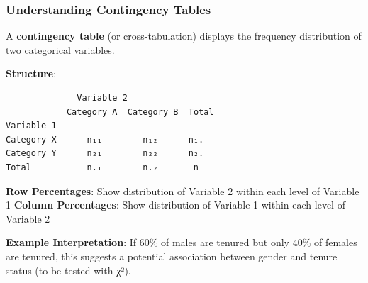 \documentclass[11pt]{article}
\begin{document}
    \subsubsection{Understanding Contingency
Tables}\label{understanding-contingency-tables}

A \textbf{contingency table} (or cross-tabulation) displays the
frequency distribution of two categorical variables.

\textbf{Structure}:

\begin{verbatim}
              Variable 2
            Category A  Category B  Total
Variable 1  
Category X      n₁₁        n₁₂      n₁.
Category Y      n₂₁        n₂₂      n₂.
Total           n.₁        n.₂       n
\end{verbatim}

\textbf{Row Percentages}: Show distribution of Variable 2 within each
level of Variable 1 \textbf{Column Percentages}: Show distribution of
Variable 1 within each level of Variable 2

\textbf{Example Interpretation}: If 60\% of males are tenured but only
40\% of females are tenured, this suggests a potential association
between gender and tenure status (to be tested with χ²).
\end{document}
